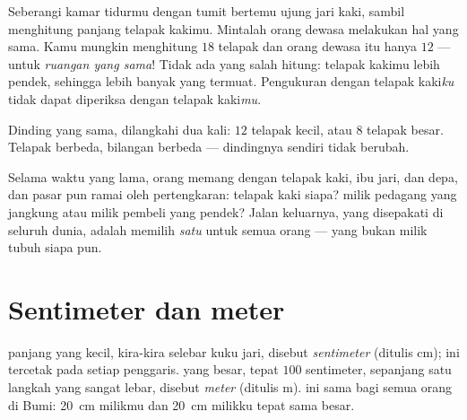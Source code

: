 \begin{example}\label{ex:g2:measuring-length:pace}
Seberangi kamar tidurmu dengan tumit bertemu ujung jari kaki, sambil
menghitung panjang telapak kakimu. Mintalah orang dewasa melakukan hal
yang sama. Kamu mungkin menghitung $18$ telapak dan orang dewasa itu
hanya $12$ --- untuk \emph{ruangan yang sama}! Tidak ada yang salah
hitung: telapak kakimu lebih pendek, sehingga lebih banyak yang
termuat. Pengukuran dengan telapak kaki\emph{ku} tidak dapat diperiksa
dengan telapak kaki\emph{mu}.
\end{example}

\begin{omfigure}

{\small Dinding yang sama, dilangkahi dua kali: $12$ telapak kecil,
atau $8$ telapak besar. Telapak berbeda, bilangan berbeda ---
dindingnya sendiri tidak berubah.}
\end{omfigure}

\begin{remark}\label{rem:g2:measuring-length:argument}
Selama waktu yang lama, orang memang  dengan telapak kaki, ibu
jari, dan depa, dan pasar pun ramai oleh pertengkaran: telapak kaki
siapa? milik pedagang yang jangkung atau milik pembeli yang pendek?
Jalan keluarnya, yang disepakati di seluruh dunia, adalah memilih
\emph{satu}  untuk semua orang ---  yang bukan milik tubuh
siapa pun.
\end{remark}

\section{Sentimeter dan meter}

\begin{definition}\label{def:g2:measuring-length:units}
 panjang yang kecil, kira-kira selebar kuku jari, disebut
\emph{sentimeter} (ditulis \unit{cm});  ini
tercetak pada setiap penggaris.  yang besar, tepat $100$
sentimeter, sepanjang satu langkah yang sangat lebar, disebut
\emph{meter} (ditulis \unit{m}).  ini sama bagi
semua orang di Bumi: \qty{20}{cm} milikmu dan \qty{20}{cm} milikku
tepat sama besar.
\end{definition}

